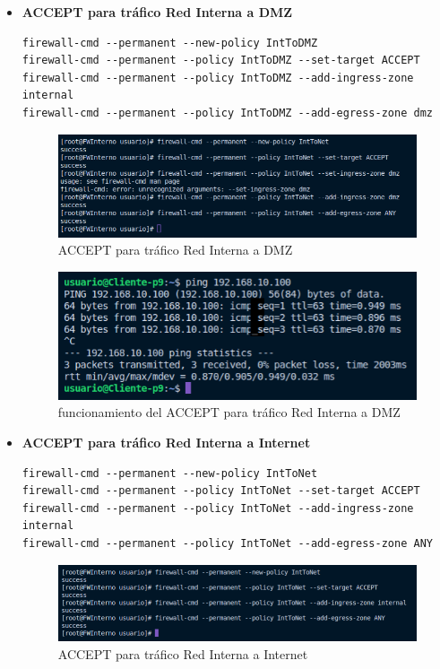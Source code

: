 \documentclass[11pt]{report}
\begin{document}
\begin{itemize}
  \item \textbf{ACCEPT para tráfico Red Interna a DMZ}
  \begin{verbatim}
firewall-cmd --permanent --new-policy IntToDMZ
firewall-cmd --permanent --policy IntToDMZ --set-target ACCEPT
firewall-cmd --permanent --policy IntToDMZ --add-ingress-zone internal
firewall-cmd --permanent --policy IntToDMZ --add-egress-zone dmz
  \end{verbatim}
  \begin{figure}[H]
    \centering
    \includegraphics[scale=0.55]{img/accept_int_to_dmz.png}
    \caption{ACCEPT para tráfico Red Interna a DMZ}
    \label{fig:ACCEPT para tráfico Red Interna a DMZ}
  \end{figure}
  \begin{figure}[H]
    \centering
    \includegraphics[scale=0.63]{img/funcionamiento_int_to_dmz.png}
    \caption{funcionamiento del ACCEPT para tráfico Red Interna a DMZ}
    \label{fig:funcionamiento ACCEPT para tráfico Red Interna a DMZ}
  \end{figure}

  \item \textbf{ACCEPT para tráfico Red Interna a Internet}
  \begin{verbatim}
firewall-cmd --permanent --new-policy IntToNet
firewall-cmd --permanent --policy IntToNet --set-target ACCEPT
firewall-cmd --permanent --policy IntToNet --add-ingress-zone internal
firewall-cmd --permanent --policy IntToNet --add-egress-zone ANY
  \end{verbatim}
  \begin{figure}[H]
    \centering
    \includegraphics[scale=0.55]{img/accept_int_to_net.png}
    \caption{ACCEPT para tráfico Red Interna a Internet}
    \label{fig:ACCEPT para tráfico Red Interna a Internet}
  \end{figure}


\end{itemize}
\end{document}
